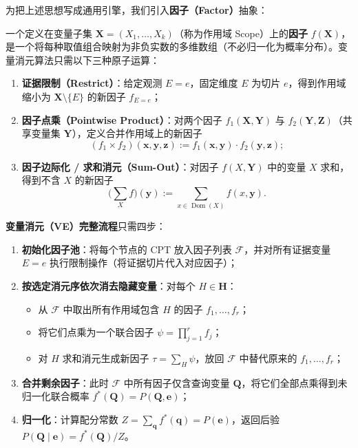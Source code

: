 为把上述思想写成通用引擎，我们引入\textbf{因子（Factor）}抽象：

\begin{defBox}
\begin{definition}[因子与三大原子运算]\label{def:factor}
一个定义在变量子集 $\mathbf{X} = (X_1, \dots, X_k)$（称为作用域 Scope）上的\textbf{因子} $f(\mathbf{X})$，是一个将每种取值组合映射为非负实数的多维数组（不必归一化为概率分布）。变量消元算法只需以下三种原子运算：
\begin{enumerate}
  \item \textbf{证据限制（Restrict）}：给定观测 $E = e$，固定维度 $E$ 为切片 $e$，得到作用域缩小为 $\mathbf{X} \setminus \{E\}$ 的新因子 $f_{E=e}$；
  \item \textbf{因子点乘（Pointwise Product）}：对两个因子 $f_1(\mathbf{X}, \mathbf{Y})$ 与 $f_2(\mathbf{Y}, \mathbf{Z})$（共享变量集 $\mathbf{Y}$），定义合并作用域上的新因子
  \[
    (f_1 \times f_2)(\mathbf{x}, \mathbf{y}, \mathbf{z}) := f_1(\mathbf{x}, \mathbf{y}) \cdot f_2(\mathbf{y}, \mathbf{z});
  \]
  \item \textbf{因子边际化 / 求和消元（Sum-Out）}：对因子 $f(X, \mathbf{Y})$ 中的变量 $X$ 求和，得到不含 $X$ 的新因子
  \[
    \Big(\sum_{X} f\Big)(\mathbf{y}) := \sum_{x \in \operatorname{Dom}(X)} f(x, \mathbf{y}).
  \]
\end{enumerate}
\end{definition}
\end{defBox}

\textbf{变量消元（VE）完整流程}只需四步：
\begin{enumerate}
  \item \textbf{初始化因子池}：将每个节点的 CPT 放入因子列表 $\mathcal{F}$，并对所有证据变量 $E = e$ 执行限制操作（将证据切片代入对应因子）；
  \item \textbf{按选定消元序依次消去隐藏变量}：对每个 $H \in \mathbf{H}$：
  \begin{itemize}
    \item 从 $\mathcal{F}$ 中取出所有作用域包含 $H$ 的因子 $f_1, \dots, f_r$；
    \item 将它们点乘为一个联合因子 $\psi = \prod_{j=1}^r f_j$；
    \item 对 $H$ 求和消元生成新因子 $\tau = \sum_H \psi$，放回 $\mathcal{F}$ 中替代原来的 $f_1, \dots, f_r$；
  \end{itemize}
  \item \textbf{合并剩余因子}：此时 $\mathcal{F}$ 中所有因子仅含查询变量 $\mathbf{Q}$，将它们全部点乘得到未归一化联合概率 $f^*(\mathbf{Q}) = P(\mathbf{Q}, \mathbf{e})$；
  \item \textbf{归一化}：计算配分常数 $Z = \sum_{\mathbf{q}} f^*(\mathbf{q}) = P(\mathbf{e})$，返回后验 $P(\mathbf{Q}\mid \mathbf{e}) = f^*(\mathbf{Q}) / Z$。
\end{enumerate}

